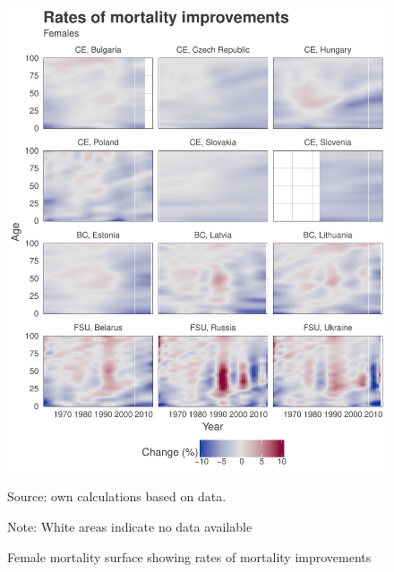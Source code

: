 \documentclass{article}
\begin{document}
\begin{figure}[h!]
\caption{Female mortality surface showing rates of mortality improvements}
\centering
\begin{center}
\includegraphics[scale=.55]{Figures/Romi_females.pdf}
\end{center}
Source: own calculations based on \citet{HMD} data. 
\begin{small}
Note: White areas indicate no data available
\end{small}
\end{figure}

\newpage
\end{document}
